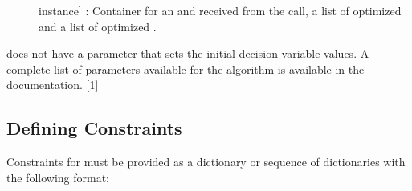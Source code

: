 \documentclass[letterpaper,10pt,english]{sphinxmanual}
\begin{document}
\begin{description}
\item[{}] \leavevmode{[} instance{]}
: Container for an  and  received from
the  call, a list of optimized  and a list of
optimized .

\end{description}

 does not have a parameter that sets the initial decision
variable values. A complete list of parameters available for the
 algorithm is available in the documentation. {[}1{]}


\subsection{Defining Constraints}
\label{\detokenize{optimizers:defining-constraints-3}}\label{\detokenize{optimizers:defining-constraints-2-1}}
Constraints for  must be provided as a dictionary or sequence of
dictionaries with the following format:

\begin{sphinxVerbatim}[commandchars=\\\{\}]
  \PYG{p}{[}    
                   
                   
                   
                 \PYG{p}{]}
\end{sphinxVerbatim}
\end{document}
